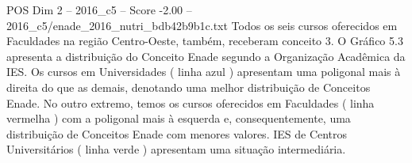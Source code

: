 \begin{textsample}{POS Dim 2 – 2016\_c5 – Score -2.00 – 2016\_c5/enade\_2016\_nutri\_bdb42b9b1c.txt}
Todos os seis cursos oferecidos em Faculdades na região Centro-Oeste, também, receberam conceito 3.
O Gráfico 5.3 apresenta a distribuição do Conceito Enade segundo a Organização Acadêmica da IES.
Os cursos em Universidades ( linha azul ) apresentam uma poligonal mais à direita do que as demais, denotando uma melhor distribuição de Conceitos Enade.
No outro extremo, temos os cursos oferecidos em Faculdades ( linha vermelha ) com a poligonal mais à esquerda e, consequentemente, uma distribuição de Conceitos Enade com menores valores.
IES de Centros Universitários ( linha verde ) apresentam uma situação intermediária.

\end{textsample}

